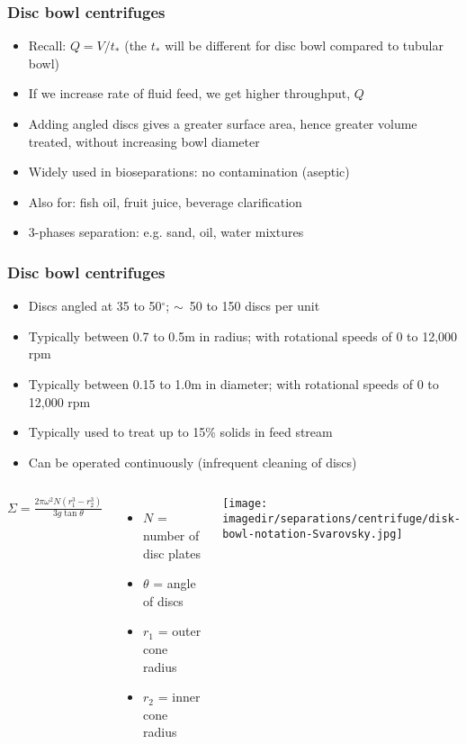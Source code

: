 \begin{frame}\frametitle{Disc bowl centrifuges}
	\begin{itemize}
		\item	Recall: $Q = V / t_*$ (the $t_*$ will be different for disc bowl compared to tubular bowl)
		\item	If we increase rate of fluid feed, we get higher throughput, $Q$
		\item	Adding angled discs gives a greater surface area, hence greater volume treated, without increasing bowl diameter
		\item	Widely used in bioseparations: no contamination (aseptic)
		\item	Also for: fish oil, fruit juice, beverage clarification
		\item	3-phases separation: e.g. sand, oil, water mixtures
	\end{itemize}
\end{frame}

\begin{frame}\frametitle{Disc bowl centrifuges}
	\begin{itemize}
		\item	Discs angled at 35 to 50$^\circ$; $\sim$~50 to 150 discs per unit
		\item	Typically between 0.7 to 0.5m in radius; with rotational speeds of 0 to 12,000 rpm
		\item	Typically between 0.15 to 1.0m in diameter; with rotational speeds of 0 to 12,000 rpm
		\item	Typically used to treat up to 15\% solids in feed stream
		\item	Can be operated continuously (infrequent cleaning of discs)
	\end{itemize}
	\vspace{-12pt}
	\begin{columns}[c]
			$\Sigma = \displaystyle \frac{2\pi\omega^2 N(r_1^3 - r_2^3)}{3g \tan \theta}$
			\vspace{24pt}
			\begin{itemize}
				\item	$N$ = number of disc plates
				\item	$\theta$ = angle of discs
				\item	$r_1$ = outer cone radius
				\item	$r_2$ = inner cone radius
			\end{itemize}
			\begin{center}
				\texttt{[image: \\imagedir/separations/centrifuge/disk-bowl-notation-Svarovsky.jpg]}
			\end{center}
	\end{columns}
\end{frame}

